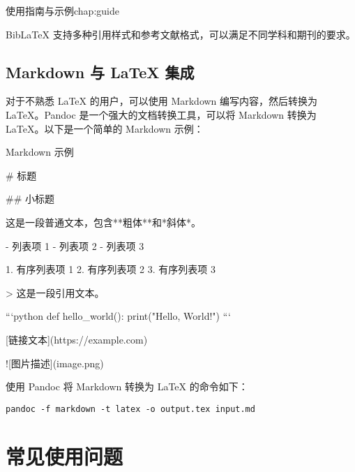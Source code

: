 \begin{cuzchapter}{使用指南与示例}{chap:guide}
\begin{listing}[htbp]
\begin{texcode}
			

			\cite{lamport1986document}
			\textcite{chen1980zhongguo}
			\parencite{stamerjohanns2009mathml}

			\printbibliography[title=参考文献]
		\end{texcode}
	\end{listing}

	BibLaTeX 支持多种引用样式和参考文献格式，可以满足不同学科和期刊的要求。

	\subsection{Markdown 与 LaTeX 集成}\label{sub:markdown}

	对于不熟悉 LaTeX 的用户，可以使用 Markdown 编写内容，然后转换为 LaTeX。Pandoc 是一个强大的文档转换工具，可以将 Markdown 转换为 LaTeX。以下是一个简单的 Markdown 示例：

	\begin{listing}[htbp]
		\caption{Markdown 示例}
		\label{code:markdown-example}
		\begin{texcode}
			# 标题

			## 小标题

			这是一段普通文本，包含**粗体**和*斜体*。

			- 列表项 1
			- 列表项 2
			- 列表项 3

			1. 有序列表项 1
			2. 有序列表项 2
			3. 有序列表项 3

			> 这是一段引用文本。

			```python
			def hello_world():
				print("Hello, World!")
			```

			[链接文本](https://example.com)

			![图片描述](image.png)
		\end{texcode}
	\end{listing}

	使用 Pandoc 将 Markdown 转换为 LaTeX 的命令如下：

	\begin{verbatim}
pandoc -f markdown -t latex -o output.tex input.md
	\end{verbatim}

	\section{常见使用问题}\label{sec:qa}


\end{cuzchapter}
